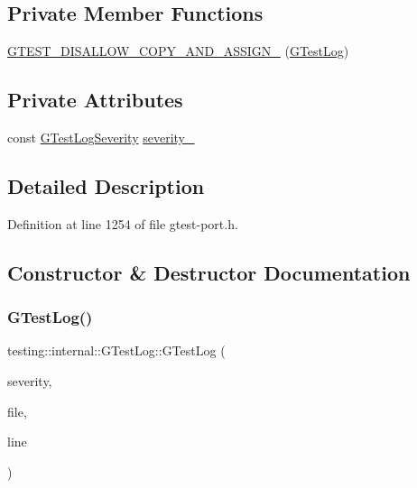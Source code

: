\subsection*{Private Member Functions}
\begin{DoxyCompactItemize}
\item 
\hyperlink{classtesting_1_1internal_1_1GTestLog_ab6032a126d36a80163fdcd406fce3aad}{G\+T\+E\+S\+T\+\_\+\+D\+I\+S\+A\+L\+L\+O\+W\+\_\+\+C\+O\+P\+Y\+\_\+\+A\+N\+D\+\_\+\+A\+S\+S\+I\+G\+N\+\_\+} (\hyperlink{classtesting_1_1internal_1_1GTestLog}{G\+Test\+Log})
\end{DoxyCompactItemize}
\subsection*{Private Attributes}
\begin{DoxyCompactItemize}
\item 
const \hyperlink{namespacetesting_1_1internal_aa6255ef3b023c5b4e1a2198d887fb977}{G\+Test\+Log\+Severity} \hyperlink{classtesting_1_1internal_1_1GTestLog_ad8f75f5845900d0d2fd3cbb048a861be}{severity\+\_\+}
\end{DoxyCompactItemize}


\subsection{Detailed Description}


Definition at line 1254 of file gtest-\/port.\+h.



\subsection{Constructor \& Destructor Documentation}
\mbox{\label{classtesting_1_1internal_1_1GTestLog_a364691bf972983a59cfa2891062a64af}} 
\subsubsection{\texorpdfstring{G\+Test\+Log()}{GTestLog()}}
{\footnotesize\ttfamily testing\+::internal\+::\+G\+Test\+Log\+::\+G\+Test\+Log (\begin{DoxyParamCaption}\item[{\hyperlink{namespacetesting_1_1internal_aa6255ef3b023c5b4e1a2198d887fb977}{G\+Test\+Log\+Severity}}]{severity,  }\item[{const char $\ast$}]{file,  }\item[{int}]{line }\end{DoxyParamCaption})}



